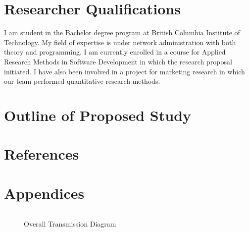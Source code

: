 \documentclass[titlepage]{article}
\begin{document}
\clearpage

\section{Researcher Qualifications}
I am student in the Bachelor degree program at British Columbia Institute of Technology.
My field of expertise is under network administration with both theory and programming.
I am currently enrolled in a course for Applied Research Methods in Software Development
in which the research proposal initiated.  I have also been involved in a project for
marketing research in which our team performed quantitative research methods.

\clearpage

\section{Outline of Proposed Study}

\clearpage

\section{References}

\clearpage

\section{Appendices}

\clearpage

\begin{lstlisting}

\end{lstlisting}

\begin{figure}[htb]                                                                       
  \begin{center}
  \end{center}
  \caption{Overall Transmission Diagram}
  \label{fig:transmission}
\end{figure}
\end{document}
